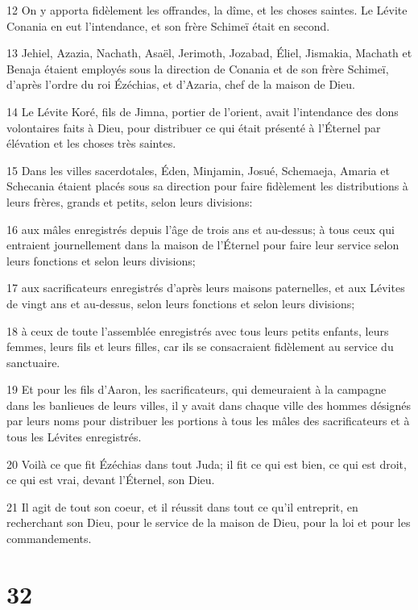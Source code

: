 \par 12 On y apporta fidèlement les offrandes, la dîme, et les choses saintes. Le Lévite Conania en eut l'intendance, et son frère Schimeï était en second.
\par 13 Jehiel, Azazia, Nachath, Asaël, Jerimoth, Jozabad, Éliel, Jismakia, Machath et Benaja étaient employés sous la direction de Conania et de son frère Schimeï, d'après l'ordre du roi Ézéchias, et d'Azaria, chef de la maison de Dieu.
\par 14 Le Lévite Koré, fils de Jimna, portier de l'orient, avait l'intendance des dons volontaires faits à Dieu, pour distribuer ce qui était présenté à l'Éternel par élévation et les choses très saintes.
\par 15 Dans les villes sacerdotales, Éden, Minjamin, Josué, Schemaeja, Amaria et Schecania étaient placés sous sa direction pour faire fidèlement les distributions à leurs frères, grands et petits, selon leurs divisions:
\par 16 aux mâles enregistrés depuis l'âge de trois ans et au-dessus; à tous ceux qui entraient journellement dans la maison de l'Éternel pour faire leur service selon leurs fonctions et selon leurs divisions;
\par 17 aux sacrificateurs enregistrés d'après leurs maisons paternelles, et aux Lévites de vingt ans et au-dessus, selon leurs fonctions et selon leurs divisions;
\par 18 à ceux de toute l'assemblée enregistrés avec tous leurs petits enfants, leurs femmes, leurs fils et leurs filles, car ils se consacraient fidèlement au service du sanctuaire.
\par 19 Et pour les fils d'Aaron, les sacrificateurs, qui demeuraient à la campagne dans les banlieues de leurs villes, il y avait dans chaque ville des hommes désignés par leurs noms pour distribuer les portions à tous les mâles des sacrificateurs et à tous les Lévites enregistrés.
\par 20 Voilà ce que fit Ézéchias dans tout Juda; il fit ce qui est bien, ce qui est droit, ce qui est vrai, devant l'Éternel, son Dieu.
\par 21 Il agit de tout son coeur, et il réussit dans tout ce qu'il entreprit, en recherchant son Dieu, pour le service de la maison de Dieu, pour la loi et pour les commandements.

\chapter{32}

